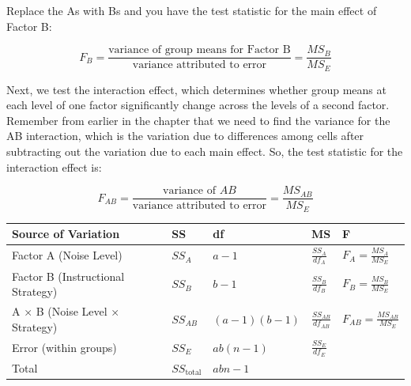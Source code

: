 \documentclass[
  letterpaper,
  DIV=11,
  numbers=noendperiod]{scrreprt}
\begin{document}
Replace the As with Bs and you have the test statistic for the main
effect of Factor B:

\[
F_B = \frac{\text{variance of group means for Factor B}}{\text{variance attributed to error}} = \frac{MS_B}{MS_E}
\]

Next, we test the interaction effect, which determines whether group
means at each level of one factor significantly change across the levels
of a second factor. Remember from earlier in the chapter that we need to
find the variance for the AB interaction, which is the variation due to
differences among cells after subtracting out the variation due to each
main effect. So, the test statistic for the interaction effect is:

\[
F_{AB} = \frac{\text{variance of } AB}{\text{variance attributed to error}} = \frac{MS_{AB}}{MS_E}
\]

\begin{longtable}[]{@{}
  >{\raggedright\arraybackslash}p{}
  >{\raggedright\arraybackslash}p{}
  >{\raggedright\arraybackslash}p{}
  >{\raggedright\arraybackslash}p{}
  >{\raggedright\arraybackslash}p{}@{}}
\toprule\noalign{}
\begin{minipage}[b]{\linewidth}\raggedright
Source of Variation
\end{minipage} & \begin{minipage}[b]{\linewidth}\raggedright
SS
\end{minipage} & \begin{minipage}[b]{\linewidth}\raggedright
df
\end{minipage} & \begin{minipage}[b]{\linewidth}\raggedright
MS
\end{minipage} & \begin{minipage}[b]{\linewidth}\raggedright
F
\end{minipage} \\
\midrule\noalign{}
\endhead
\bottomrule\noalign{}
\endlastfoot
Factor A (Noise Level) & \(SS_A\) & \(a - 1\) & \(\frac{SS_A}{df_A}\) &
\(F_A = \frac{MS_A}{MS_E}\) \\
Factor B (Instructional Strategy) & \(SS_B\) & \(b - 1\) &
\(\frac{SS_B}{df_B}\) & \(F_B = \frac{MS_B}{MS_E}\) \\
A × B (Noise Level × Strategy) & \(SS_{AB}\) & \((a - 1)(b - 1)\) &
\(\frac{SS_{AB}}{df_{AB}}\) & \(F_{AB} = \frac{MS_{AB}}{MS_E}\) \\
Error (within groups) & \(SS_E\) & \(ab(n - 1)\) & \(\frac{SS_E}{df_E}\)
& \\
Total & \(SS_{\text{total}}\) & \(abn - 1\) & & \\
\end{longtable}
\end{document}
